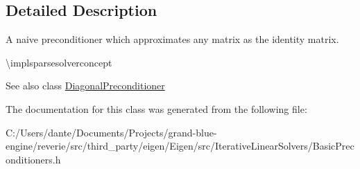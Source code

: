 \subsection{Detailed Description}
A naive preconditioner which approximates any matrix as the identity matrix. 

\textbackslash{}implsparsesolverconcept

\begin{DoxySeeAlso}{See also}
class \mbox{\hyperlink{class_eigen_1_1_diagonal_preconditioner}{Diagonal\+Preconditioner}} 
\end{DoxySeeAlso}


The documentation for this class was generated from the following file\+:\begin{DoxyCompactItemize}
\item 
C\+:/\+Users/dante/\+Documents/\+Projects/grand-\/blue-\/engine/reverie/src/third\+\_\+party/eigen/\+Eigen/src/\+Iterative\+Linear\+Solvers/Basic\+Preconditioners.\+h\end{DoxyCompactItemize}
